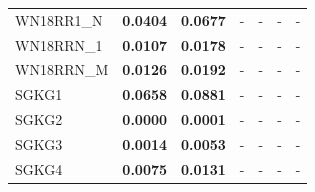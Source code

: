 \begin{table}[t]
{\begin{tabular}{l||cc||cc||cc}
WN18RR1\_N & \textbf{0.0404} & \textbf{0.0677} & - & - & - & - \\
WN18RRN\_1 & \textbf{0.0107} & \textbf{0.0178} & - & - & - & - \\
WN18RRN\_M & \textbf{0.0126} & \textbf{0.0192} & - & - & - & - \\
\hline
SGKG1 & \textbf{0.0658} & \textbf{0.0881} & - & - & - & - \\
SGKG2 & \textbf{0.0000} & \textbf{0.0001} & - & - & - & - \\
SGKG3 & \textbf{0.0014} & \textbf{0.0053} & - & - & - & - \\
SGKG4 & \textbf{0.0075} & \textbf{0.0131} & - & - & - & - \\
\hline
\end{tabular}%
}
\end{table}
